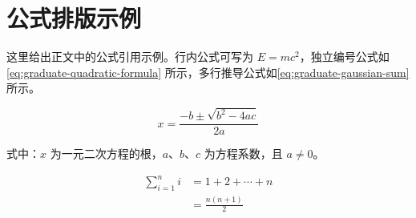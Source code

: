 \section{公式排版示例}
这里给出正文中的公式引用示例。行内公式可写为 $E=mc^2$，独立编号公式如\autoref{eq:graduate-quadratic-formula} 所示，多行推导公式如\autoref{eq:graduate-gaussian-sum} 所示。

\begin{equation}
    x = \frac{-b \pm \sqrt{b^2 - 4ac}}{2a}
    \label{eq:graduate-quadratic-formula}
\end{equation}
\begin{eqvariables}
    式中：$x$ 为一元二次方程的根，$a$、$b$、$c$ 为方程系数，且 $a \neq 0$。
\end{eqvariables}

\begin{equation}
    \begin{aligned}
        \sum_{i=1}^{n} i &= 1 + 2 + \cdots + n \\
                         &= \frac{n(n+1)}{2}
    \end{aligned}
    \label{eq:graduate-gaussian-sum}
\end{equation}
